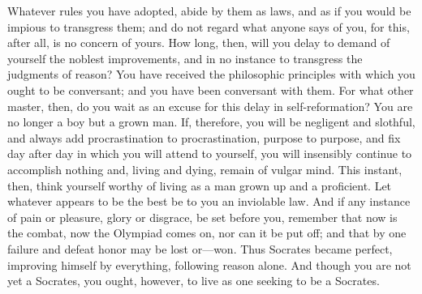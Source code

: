 Whatever rules you have adopted, abide by them as laws, and as if you
would be impious to transgress them; and do not regard what anyone says
of you, for this, after all, is no concern of yours. How long, then, will
you delay to demand of yourself the noblest improvements, and in no
instance to transgress the judgments of reason? You have received the
philosophic principles with which you ought to be conversant; and you
have been conversant with them. For what other master, then, do you wait
as an excuse for this delay in self-reformation? You are no longer a boy
but a grown man. If, therefore, you will be negligent and slothful, and
always add procrastination to procrastination, purpose to purpose, and
fix day after day in which you will attend to yourself, you will
insensibly continue to accomplish nothing and, living and dying, remain
of vulgar mind. This instant, then, think yourself worthy of living as a
man grown up and a proficient. Let whatever appears to be the best be to
you an inviolable law. And if any instance of pain or pleasure, glory or
disgrace, be set before you, remember that now is the combat, now the
Olympiad comes on, nor can it be put off; and that by one failure and
defeat honor may be lost or---won. Thus Socrates became perfect, improving
himself by everything, following reason alone. And though you are not yet
a Socrates, you ought, however, to live as one seeking to be a Socrates.
